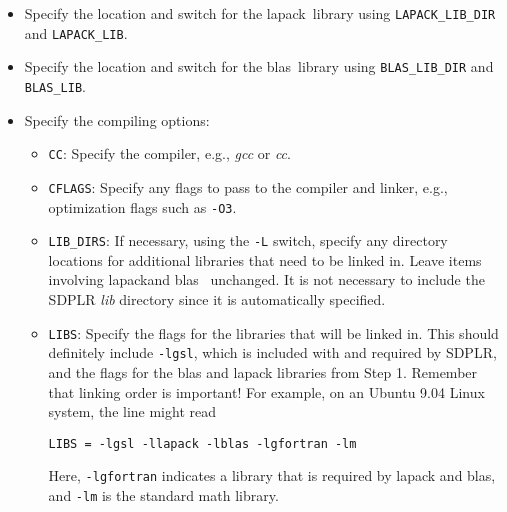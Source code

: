 \documentclass[12pt]{article}
\newcommand{\blas}{{\sc blas}}
\newcommand{\blass}{{\sc blas }}
\newcommand{\lapack}{{\sc lapack}}
\newcommand{\lapacks}{{\sc lapack }}
\newcommand{\arpacks}{{\sc arpack }}
\newcommand{\metiss}{{\sc metis }}
\begin{document}
\begin{itemize}

\item Specify the location and switch for the \lapack~library
using {\tt LAPACK\_LIB\_DIR} and {\tt LAPACK\_LIB}.

\item Specify the location and switch for the \blas~library
using {\tt BLAS\_LIB\_DIR} and {\tt BLAS\_LIB}.

\item Specify the compiling options:

\begin{itemize}

\item {\tt CC}: Specify the compiler, e.g., {\sl gcc} or {\sl
cc}.

\item {\tt CFLAGS}: Specify any flags to pass to the compiler and
linker, e.g., optimization flags such as {\tt -O3}.

\item {\tt LIB\_DIRS}: If necessary, using the {\tt -L} switch, specify
any directory locations for additional libraries that need to be
linked in. Leave items involving \lapack and \blas~ unchanged. It is
not necessary to include the SDPLR {\sl lib} directory since it is
automatically specified.

\item {\tt LIBS}: Specify the flags for the libraries that will be
linked in. This should definitely include {\tt -lgsl}, which is included
with and required by SDPLR, and the flags for the \blass and \lapacks
libraries from Step 1. Remember that linking order is important! For
example, on an Ubuntu 9.04 Linux system, the line might read
\begin{center}
{\tt LIBS = -lgsl -llapack -lblas -lgfortran -lm}
\end{center}
Here, {\tt -lgfortran} indicates a library that is required by \lapacks
and \blas, and {\tt -lm} is the standard math library.

\end{itemize}





\end{itemize}
\end{document}
